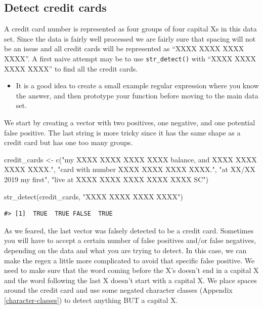 \documentclass[
]{krantz}
\makeatletter
\newenvironment{Shaded}{\begin{snugshade}}{\end{snugshade}}
\newcommand{\FunctionTok}[1]{\textcolor[rgb]{0.00,0.00,0.00}{#1}}
\newcommand{\NormalTok}[1]{#1}
\newcommand{\OtherTok}[1]{\textcolor[rgb]{0.56,0.35,0.01}{#1}}
\newcommand{\StringTok}[1]{\textcolor[rgb]{0.31,0.60,0.02}{#1}}
\newenvironment{kframe}{%
\medskip{}
\setlength{\fboxsep}{.8em}
 \def\at@end@of@kframe{}%
 \ifinner\ifhmode%
  \def\at@end@of@kframe{\end{minipage}}%
  \begin{minipage}{\columnwidth}%
 \fi\fi%
 \def\FrameCommand##1{\hskip\@totalleftmargin \hskip-\fboxsep
 \colorbox{shadecolor}{##1}\hskip-\fboxsep
     \hskip-\linewidth \hskip-\@totalleftmargin \hskip\columnwidth}%
 \MakeFramed {\advance\hsize-\width
   \@totalleftmargin\z@ \linewidth\hsize
   \@setminipage}}%
 {\par\unskip\endMakeFramed%
 \at@end@of@kframe}
\renewenvironment{Shaded}{\begin{kframe}}{\end{kframe}}
\newenvironment{rmdblock}[1]
  {\begin{shaded*}
  \begin{itemize}[left = -1cm, labelsep = 1cm]
  \renewcommand{\labelitemi}{
    \raisebox{-.7\height}[0pt][0pt]{
      {\setkeys{Gin}{width=3em,keepaspectratio}\texttt{[image: images/\#1]}}
    }
  }
 
  \item
  }
  {
  \end{itemize}
  \end{shaded*}
  }
\newenvironment{rmdnote}
  {\begin{rmdblock}{note}}
  {\end{rmdblock}}
\makeatother
\begin{document}
\hypertarget{detect-credit-cards}{%
\subsection{Detect credit cards}\label{detect-credit-cards}}

A credit card number is represented as four groups of four capital Xs in this data set.
Since the data is fairly well processed we are fairly sure that spacing will not be an issue and all credit cards will be represented as ``XXXX XXXX XXXX XXXX''.
A first naive attempt may be to use \texttt{str\_detect()} with ``XXXX XXXX XXXX XXXX'' to find all the credit cards.


\begin{rmdnote}
It is a good idea to create a small example regular expression where you
know the answer, and then prototype your function before moving to the
main data set.
\end{rmdnote}

We start by creating a vector with two positives, one negative, and one potential false positive.
The last string is more tricky since it has the same shape as a credit card but has one too many groups.

\begin{Shaded}
\begin{Highlighting}[]
\NormalTok{credit\_cards }\OtherTok{\textless{}{-}} \FunctionTok{c}\NormalTok{(}\StringTok{"my XXXX XXXX XXXX XXXX balance, and XXXX XXXX XXXX XXXX."}\NormalTok{,}
                  \StringTok{"card with number XXXX XXXX XXXX XXXX."}\NormalTok{,}
                  \StringTok{"at XX/XX 2019 my first"}\NormalTok{,}
                  \StringTok{"live at XXXX XXXX XXXX XXXX XXXX SC"}\NormalTok{)}


\FunctionTok{str\_detect}\NormalTok{(credit\_cards, }\StringTok{"XXXX XXXX XXXX XXXX"}\NormalTok{)}
\end{Highlighting}
\end{Shaded}

\begin{verbatim}
#> [1]  TRUE  TRUE FALSE  TRUE
\end{verbatim}

As we feared, the last vector was falsely detected to be a credit card.
Sometimes you will have to accept a certain number of false positives and/or false negatives, depending on the data and what you are trying to detect.
In this case, we can make the regex a little more complicated to avoid that specific false positive.
We need to make sure that the word coming before the X's doesn't end in a capital X and the word following the last X doesn't start with a capital X.
We place spaces around the credit card and use some negated character classes (Appendix \ref{character-classes}) to detect anything BUT a capital X.
\end{document}
